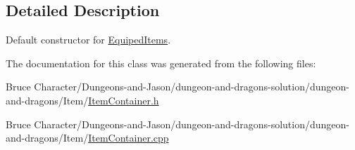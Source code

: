\subsection{Detailed Description}
Default constructor for \hyperlink{class_equiped_items}{Equiped\+Items}. 

The documentation for this class was generated from the following files\+:\begin{DoxyCompactItemize}
\item 
Bruce Character/\+Dungeons-\/and-\/\+Jason/dungeon-\/and-\/dragons-\/solution/dungeon-\/and-\/dragons/\+Item/\hyperlink{_item_container_8h}{Item\+Container.\+h}\item 
Bruce Character/\+Dungeons-\/and-\/\+Jason/dungeon-\/and-\/dragons-\/solution/dungeon-\/and-\/dragons/\+Item/\hyperlink{_item_container_8cpp}{Item\+Container.\+cpp}\end{DoxyCompactItemize}
